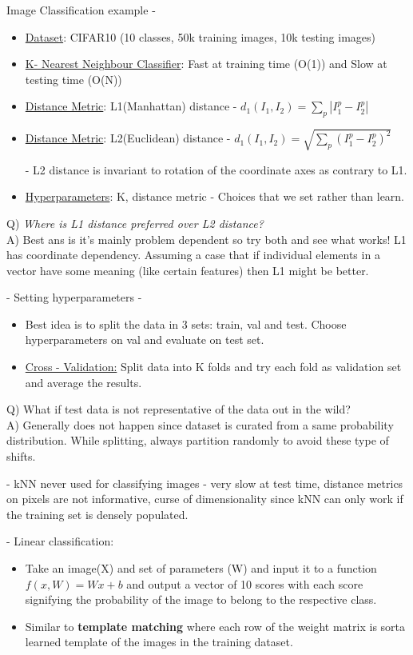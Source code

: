 \documentclass[twoside]{article}
\begin{document}
Image Classification example - 
\begin{itemize}
\item \underline{Dataset}: CIFAR10 (10 classes, 50k training images, 10k testing images)
\item \underline{K- Nearest Neighbour Classifier}: Fast at training time (O(1)) and Slow at testing time (O(N))
\item \underline{Distance Metric}: L1(Manhattan) distance - $d_1(I_1,I_2) = \displaystyle \sum_p |I^p_1 - I^p_2|$
\item \underline{Distance Metric}: L2(Euclidean) distance - $d_1(I_1,I_2) = \displaystyle \sqrt{\sum_p (I^p_1 - I^p_2)^2}
$

- L2 distance is invariant to rotation of the coordinate axes as contrary to L1.

\item \underline{Hyperparameters}: K, distance metric
- Choices that we set rather than learn.
\end{itemize}

Q) \textit{Where is L1 distance preferred over L2 distance?} \\
A) Best ans is it's mainly problem dependent so try both and see what works! L1 has coordinate dependency. Assuming a case that if individual elements in a vector have some meaning (like certain features) then L1 might be better. 

- Setting hyperparameters - 
\begin{itemize}
    \item Best idea is to split the data in 3 sets: train, val and test. Choose hyperparameters on val and evaluate on test set.
    \item \underline {Cross - Validation:} Split data into K folds and try each fold as validation set and average the results.
\end{itemize}

Q) What if test data is not representative of the data out in the wild?\\
A) Generally does not happen since dataset is curated from a same probability distribution. While splitting, always partition randomly to avoid these type of shifts.

- kNN never used for classifying images - very slow at test time, distance metrics on pixels are not informative, curse of dimensionality since kNN can only work if the training set is densely populated. 

- Linear classification:
\begin{itemize}
\item Take an image(X) and set of parameters (W) and input it to a function $f(x, W) = Wx + b$  and output a vector of 10 scores with each score signifying the probability of the image to belong to the respective class.

\item Similar to \textbf{template matching} where each row of the weight matrix is sorta learned template of the images in the training dataset.
\end{itemize}
\end{document}
